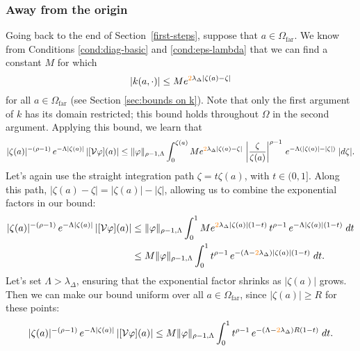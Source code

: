 \documentclass{article}
\theoremstyle{plain}
\newcommand{\volterra}{\mathcal{V}}
\newcommand{\domain}{\Omega}
\newcommand{\far}{\Omega_\text{far}}
\begin{document}
\subsubsection{Away from the origin}\label{far-bound}
Going back to the end of Section~\ref{first-steps}, suppose that $a \in \far$. We know from Conditions \eqref{cond:diag-basic} and \eqref{cond:eps-lambda} that we can find a constant $M$ for which
\[ |k(a, \cdot)| \le M e^{\textcolor{orange}{2}\lambda_\Delta |\zeta(a) - \zeta|} \]
for all $a \in \far$ (see Section \ref{sec:bounds on k}). Note that only the first argument of $k$ has its domain restricted; this bound holds throughout $\domain$ in the second argument. Applying this bound, we learn that
\[ |\zeta(a)|^{-(\rho-1)}\,e^{-\Lambda|\zeta(a)|}\,|[\volterra\varphi](a)| \le \|\varphi\|_{\rho-1, \Lambda} \int_0^{\zeta(a)} M e^{\textcolor{orange}{2}\lambda_\Delta |\zeta(a) - \zeta|}\,\left|\frac{\zeta}{\zeta(a)}\right|^{\rho-1}\,e^{-\Lambda(|\zeta(a)| - |\zeta|)}\;|d\zeta|. \]
Let's again use the straight integration path $\zeta = t \zeta(a)$, with $t \in (0, 1]$. Along this path, $|\zeta(a) - \zeta| = |\zeta(a)| - |\zeta|$, allowing us to combine the exponential factors in our bound:
\begin{align*}
|\zeta(a)|^{-(\rho-1)}\,e^{-\Lambda|\zeta(a)|}\,|[\volterra\varphi](a)| & \le \|\varphi\|_{\rho-1, \Lambda} \int_0^1 M e^{\textcolor{orange}{2}\lambda_\Delta |\zeta(a)|(1 - t)}\,t^{\rho-1}\,e^{-\Lambda |\zeta(a)|(1 - t)}\;dt \\
& \le M \|\varphi\|_{\rho-1, \Lambda} \int_0^1 t^{\rho-1}\,e^{-(\Lambda - \textcolor{orange}{2}\lambda_\Delta)|\zeta(a)|(1 - t)}\;dt.
\end{align*}
Let's set $\Lambda > \lambda_\Delta$, ensuring that the exponential factor shrinks as $|\zeta(a)|$ grows. Then we can make our bound uniform over all $a \in \far$, since $|\zeta(a)| \ge R$ for these points:
\[ |\zeta(a)|^{-(\rho-1)}\,e^{-\Lambda|\zeta(a)|}\,|[\volterra\varphi](a)| \le M \|\varphi\|_{\rho-1, \Lambda} \int_0^1 t^{\rho-1}\,e^{-(\Lambda - \textcolor{orange}{2}\lambda_\Delta)R(1 - t)}\;dt. \]
\end{document}
